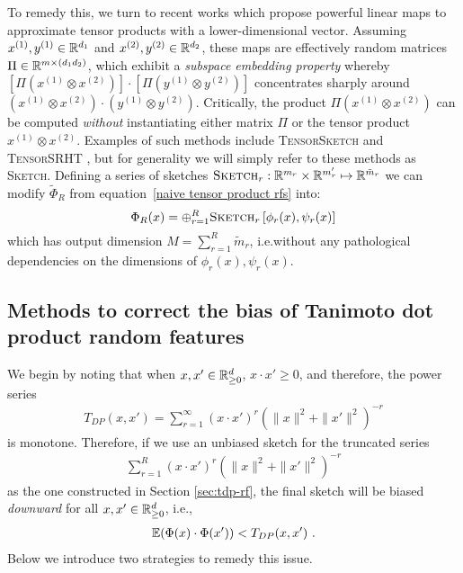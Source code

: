 To remedy this, we turn to recent works which propose powerful linear maps
to approximate tensor products
with a lower-dimensional vector.
Assuming $x^{(1)},y^{(1)}\in\mathbb{R}^{d_1}$ and $x^{(2)},y^{(2)}\in\mathbb{R}^{d_2}$,
these maps are effectively random matrices $\Pi\in \mathbb{R}^{m\times (d_1d_2)}$,
which exhibit a \emph{subspace embedding property} whereby $[\Pi(x^{(1)}\otimes x^{(2)})]\cdot[\Pi(y^{(1)}\otimes y^{(2)})]$ concentrates sharply around $(x^{(1)}\otimes x^{(2)})\cdot(y^{(1)}\otimes y^{(2)})$.
Critically, the product $\Pi(x^{(1)}\otimes x^{(2)})$ can be computed \emph{without} instantiating either matrix $\Pi$ or the tensor product $x^{(1)}\otimes x^{(2)}$.
Examples of such methods include
\textsc{TensorSketch} and \textsc{TensorSRHT}
\citep{pagh2013compressed,pham2013fast, ahle2020oblivious},
but for generality we will simply refer to these methods as \textsc{Sketch}.
Defining a series of sketches $\textsc{Sketch}_r:\mathbb{R}^{m_r}\times \mathbb{R}^{m'_r}\mapsto \mathbb{R}^{\tilde{m}_r}$
we can modify $\tilde\Phi_R$ from equation~\ref{naive tensor product rfs} into:
\begin{equation}\label{sketch tensor product rfs}
    \Phi_R(x) = \oplus_{r=1}^R \textsc{Sketch}_r\left[\phi_r(x),  \psi_r(x)\right]
\end{equation}
which has output dimension $M=\sum_{r=1}^R \tilde{m}_r$, i.e.\@ without any pathological dependencies on the dimensions of $\phi_r(x),\psi_r(x)$.


\subsection{Methods to correct the bias of Tanimoto dot product random features}
\label{apdx:bias-correction}

We begin by noting that when $x,x'\in\mathbb{R}_{\ge 0}^d$, $x\cdot x'\ge 0$, and therefore, the power series
\begin{align*}
T_{DP}(x,x')=\sum_{r=1}^\infty (x\cdot x')^r(\|x\|^2+\|x'\|^2)^{-r}
\end{align*}
is monotone. Therefore, if we use an unbiased sketch for the truncated series 
\begin{align*}
\sum_{r=1}^R (x\cdot x')^r(\|x\|^2+\|x'\|^2)^{-r}
\end{align*}
as the one constructed in Section \ref{sec:tdp-rf}, the final sketch will be biased \emph{downward}
for all $x,x'\in\mathbb{R}_{\ge 0}^d$, i.e.,
\begin{align*}
\mathbb{E}(\Phi(x)\cdot\Phi(x'))< T_{DP}(x,x') \ .
\end{align*}
Below we introduce two strategies to remedy this issue.

